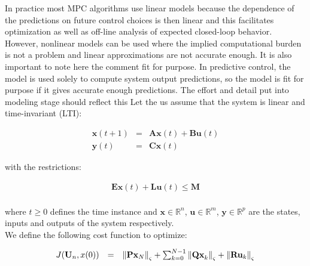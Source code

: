 	\label{BASICCSR:sec:OptimalControl}
	
	In practice most MPC algorithms use linear models because the dependence of the predictions on future control choices is then linear and this facilitates optimization as well as off-line analysis of expected closed-loop behavior. However, nonlinear
models can be used where the implied computational burden is not a problem and linear approximations are not accurate enough.
It is also important to note here the comment fit for purpose. In predictive control, the model is used solely to compute system output predictions, so the model is fit for purpose if it gives accurate enough predictions. The effort and detail put into
modeling stage should reflect this
	Let the us assume that the system is linear and time-invariant (LTI):
	
	    \begin{equation}
        \begin{array}{rcl}
            \textbf{x}(t+1)&=&\textbf{Ax}(t)+\textbf{Bu}(t)\\
						\textbf{y}(t)&=&\textbf{Cx}(t)
        \end{array}
        \label{BASICMPC:equ:basic_LTI}
    \end{equation}
		
	with the restrictions:
	
	\begin{equation}
        \begin{array}{rcl}
            \textbf{Ex}(t)+\textbf{Lu}(t)\leq \textbf{M}\\
        \end{array}
        \label{BASICMPC:equ:restrict_LTI}
    \end{equation}
		
		where $t\geq0$ defines the time instance and $\textbf{x}\in \mathbb{R}^n$, $\textbf{u}\in \mathbb{R}^m$, $\textbf{y}\in \mathbb{R}^p$ are the states, inputs and outputs of the system respectively. \\
	 We define the following cost function to optimize:
		
		\begin{equation}
        \begin{array}{rcl}
         J(\textbf{U}_n,x(0))&=&\left\lVert{\textbf{Px}_N}\right\rVert_\varsigma+\sum^{N-1}_{k=0}\left\lVert\textbf{Qx}_k\right\rVert_\varsigma+\left\lVert\textbf{Ru}_k\right\rVert_\varsigma\\
        \end{array}
        \label{BASICMPC:equ:cost_function}
    \end{equation}
		
